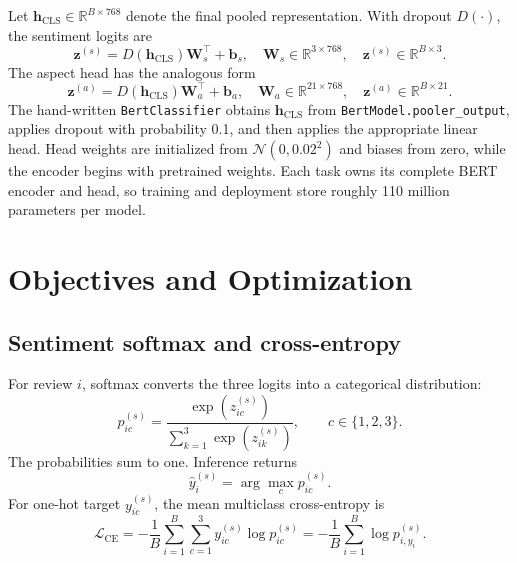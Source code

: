 \documentclass[11pt,a4paper]{report}
\newcommand{\R}{\mathbb{R}}
\newcommand{\code}[1]{\texttt{#1}}
\begin{document}
Let \(\mathbf{h}_{\mathrm{CLS}}\in\R^{B\times768}\) denote the final pooled representation.  With dropout \(D(\cdot)\), the sentiment logits are
\begin{equation}
  \mathbf{z}^{(s)}=D(\mathbf{h}_{\mathrm{CLS}})\mathbf{W}_s^{\top}+\mathbf{b}_s,
  \quad \mathbf{W}_s\in\R^{3\times768},\quad \mathbf{z}^{(s)}\in\R^{B\times3}.
\end{equation}
The aspect head has the analogous form
\begin{equation}
  \mathbf{z}^{(a)}=D(\mathbf{h}_{\mathrm{CLS}})\mathbf{W}_a^{\top}+\mathbf{b}_a,
  \quad \mathbf{W}_a\in\R^{21\times768},\quad \mathbf{z}^{(a)}\in\R^{B\times21}.
\end{equation}
The hand-written \code{BertClassifier} obtains \(\mathbf{h}_{\mathrm{CLS}}\) from \code{BertModel.pooler\_output}, applies dropout with probability 0.1, and then applies the appropriate linear head.  Head weights are initialized from \(\mathcal{N}(0,0.02^2)\) and biases from zero, while the encoder begins with pretrained weights.  Each task owns its complete BERT encoder and head, so training and deployment store roughly 110 million parameters per model.

\chapter{Objectives and Optimization}

\section{Sentiment softmax and cross-entropy}

For review \(i\), softmax converts the three logits into a categorical distribution:
\begin{equation}
  p^{(s)}_{ic}=\frac{\exp(z^{(s)}_{ic})}
  {\sum_{k=1}^{3}\exp(z^{(s)}_{ik})},\qquad c\in\{1,2,3\}.
\end{equation}
The probabilities sum to one.  Inference returns
\begin{equation}
  \widehat{y}^{(s)}_i=\arg\max_c p^{(s)}_{ic}.
\end{equation}
For one-hot target \(y^{(s)}_{ic}\), the mean multiclass cross-entropy is
\begin{equation}
  \mathcal{L}_{\mathrm{CE}}=-\frac{1}{B}\sum_{i=1}^{B}
  \sum_{c=1}^{3}y^{(s)}_{ic}\log p^{(s)}_{ic}
  =-\frac{1}{B}\sum_{i=1}^{B}\log p^{(s)}_{i,y_i}.
\end{equation}
\end{document}
